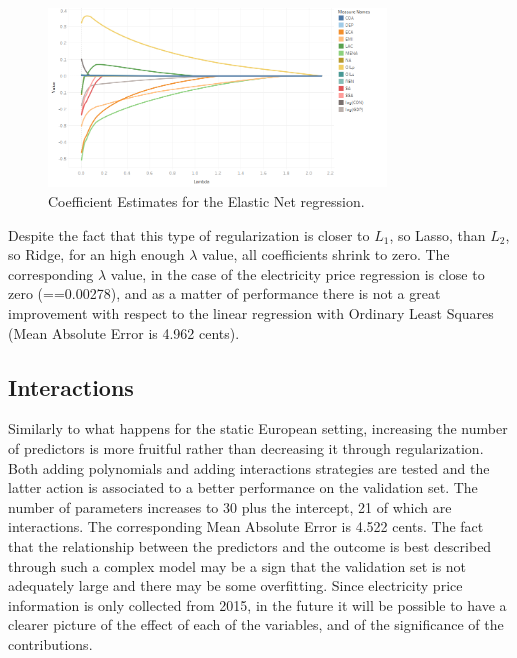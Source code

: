 \documentclass[a4paper,12pt]{book}
\begin{document}
\begin{figure}[tb]
\begin{center}
\captionsetup{justification=centering}
\includegraphics[width=0.8\textwidth]{Images/elastic.png}
\caption{Coefficient Estimates for the Elastic Net regression.}
\label{fig:elastic}
\end{center}
\end{figure}

Despite the fact that this type of regularization is closer to $L_1$, so Lasso, than $L_2$, so Ridge, for an high enough $\lambda$ value, all coefficients shrink to zero. The corresponding $\lambda$ value, in the case of the electricity price regression is close to zero (==0.00278), and as a matter of performance there is not a great improvement with respect to the linear regression with Ordinary Least Squares (Mean Absolute Error is 4.962 cents).

\subsection{Interactions}

Similarly to what happens for the static European setting, increasing the number of predictors is more fruitful rather than decreasing it through regularization. Both adding polynomials and adding interactions strategies are tested and the latter action is associated to a better performance on the validation set. The number of parameters increases to 30 plus the intercept, 21 of which are interactions. The corresponding Mean Absolute Error is 4.522 cents. The fact that the relationship between the predictors and the outcome is best described through such a complex model may be a sign that the validation set is not adequately large and there may be some overfitting. Since electricity price information is only collected from 2015, in the future it will be possible to have a clearer picture of the effect of each of the variables, and of the significance of the contributions.
\end{document}
